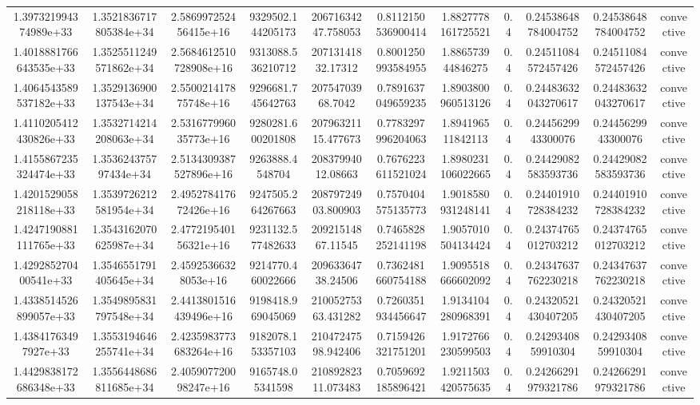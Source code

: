 \begin{table}
\begin{tabular}{ccccccccccc}
1.397321994374989e+33 & 1.3521836717805384e+34 & 2.586997252456415e+16 & 9329502.144205173 & 20671634247.758053 & 0.8112150536900414 & 1.8827778161725521 & 0.4 & 0.24538648784004752 & 0.24538648784004752 & convective \\
1.4018881766643535e+33 & 1.3525511249571862e+34 & 2.5684612510728908e+16 & 9313088.536210712 & 20713141832.17312 & 0.8001250993584955 & 1.886573944846275 & 0.4 & 0.24511084572457426 & 0.24511084572457426 & convective \\
1.4064543589537182e+33 & 1.3529136900137543e+34 & 2.550021417875748e+16 & 9296681.745642763 & 20754703968.7042 & 0.7891637049659235 & 1.8903800960513126 & 0.4 & 0.24483632043270617 & 0.24483632043270617 & convective \\
1.4110205412430826e+33 & 1.3532714214208063e+34 & 2.531677996035773e+16 & 9280281.600201808 & 20796321115.477673 & 0.7783297996204063 & 1.894196511842113 & 0.4 & 0.2445629943300076 & 0.2445629943300076 & convective \\
1.4155867235324474e+33 & 1.353624375797434e+34 & 2.5134309387527896e+16 & 9263888.4548704 & 20837994012.08663 & 0.7676223611521024 & 1.8980231106022665 & 0.4 & 0.24429082583593736 & 0.24429082583593736 & convective \\
1.4201529058218118e+33 & 1.3539726212581954e+34 & 2.495278417672426e+16 & 9247505.264267663 & 20879724903.800903 & 0.7570404575135773 & 1.9018580931248141 & 0.4 & 0.24401910728384232 & 0.24401910728384232 & convective \\
1.4247190881111765e+33 & 1.3543162070625987e+34 & 2.477219540156321e+16 & 9231132.577482633 & 20921514867.11545 & 0.7465828252141198 & 1.9057010504134424 & 0.4 & 0.24374765012703212 & 0.24374765012703212 & convective \\
1.429285270400541e+33 & 1.3546551791405645e+34 & 2.45925366328053e+16 & 9214770.460022666 & 20963364738.24506 & 0.7362481660754188 & 1.9095518666602092 & 0.4 & 0.24347637762230218 & 0.24347637762230218 & convective \\
1.4338514526899057e+33 & 1.3549895831797548e+34 & 2.4413801516439496e+16 & 9198418.969045069 & 21005275363.431282 & 0.7260351934456647 & 1.9134104280968391 & 0.4 & 0.24320521430407205 & 0.24320521430407205 & convective \\
1.43841763497927e+33 & 1.3553194646255741e+34 & 2.4235983773683264e+16 & 9182078.153357103 & 21047247598.942406 & 0.7159426321751201 & 1.9172766230599503 & 0.4 & 0.2429340859910304 & 0.2429340859910304 & convective \\
1.4429838172686348e+33 & 1.3556448686811685e+34 & 2.405907720098247e+16 & 9165748.05341598 & 21089282311.073483 & 0.7059692185896421 & 1.9211503420575635 & 0.4 & 0.24266291979321786 & 0.24266291979321786 & convective \\

\end{tabular}
\end{table}
